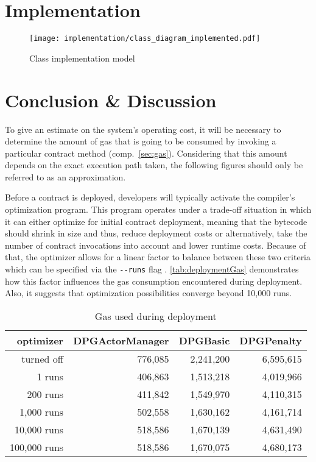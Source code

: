 \begin{appendices}
\FloatBarrier


\chapter{Implementation}
\label{app:implementation}

\pagebreak

\begin{sidewaysfigure}[ht]
    \texttt{[image: implementation/class\_diagram\_implemented.pdf]}
    \caption{Class implementation model}
	\label{fig:classImplementationModel}
\end{sidewaysfigure}

\FloatBarrier

\chapter{Conclusion \& Discussion}
\label{app:conclusion}

To give an estimate on the system's operating cost, it will be necessary to determine the amount of gas that is going to be consumed by invoking a particular contract method (comp.~\ref{sec:gas}). Considering that this amount depends on the exact execution path taken, the following figures should only be referred to as an approximation.

Before a contract is deployed, developers will typically activate the compiler's optimization program. This program operates under a trade-off situation in which it can either optimize for initial contract deployment, meaning that the bytecode should shrink in size and thus, reduce deployment costs or alternatively, take the number of contract invocations into account and lower runtime costs. Because of that, the optimizer allows for a linear factor to balance between these two criteria which can be specified via the \texttt{-{}-runs} flag \cite[p.~125]{solidityDocs} \cite{compilerOptimization}. \autoref{tab:deploymentGas} demonstrates how this factor influences the gas consumption encountered during deployment. Also, it suggests that optimization possibilities converge beyond 10,000 runs.

\begin{table}[hbt]
	\centering	
	\begin{tabular}{r|r|r|r}
    	optimizer & DPGActorManager & DPGBasic & DPGPenalty \\
    	\hline
    	turned off & 776,085 & 2,241,200 & 6,595,615 \\
    	1 runs & 406,863 & 1,513,218 & 4,019,966 \\ 
    	200 runs & 411,842 & 1,549,970 & 4,110,315 \\
    	1,000 runs & 502,558 & 1,630,162 & 4,161,714 \\ 
    	10,000 runs & 518,586 & 1,670,139 & 4,631,490 \\
    	100,000 runs & 518,586 & 1,670,075 & 4,680,173 \\
	\end{tabular}
	\caption{Gas used during deployment}
	\label{tab:deploymentGas}
\end{table}


\end{appendices}
